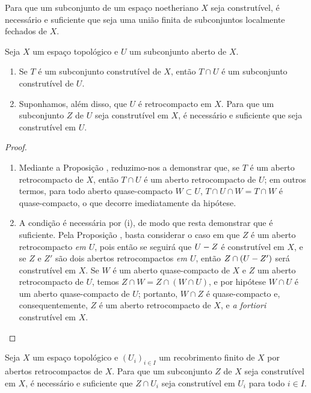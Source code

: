 \begin{corollary}[9.1.7]
\label{0.9.1.7}
Para que um subconjunto de um espaço noetheriano $X$ seja construtível, é necessário e suficiente que seja uma união finita de subconjuntos localmente fechados de $X$.
\end{corollary}

\begin{proposition}[9.1.8]
\label{0.9.1.8}
Seja $X$ um espaço topológico e $U$ um subconjunto aberto de $X$.
\begin{enumerate}
  \item[{\rm(i)}] Se $T$ é um subconjunto construtível de $X$, então $T\cap U$ é um subconjunto construtível de $U$.
  \item[{\rm(ii)}] Suponhamos, além disso, que $U$ é retrocompacto em $X$. Para que um subconjunto $Z$ de $U$ seja construtível em $X$, é necessário e suficiente que seja construtível em $U$.
\end{enumerate}
\end{proposition}

\begin{proof}
\medskip\noindent
\begin{enumerate}
  \item[(i)] Mediante a Proposição , reduzimo-nos a demonstrar que, se $T$ é um aberto retrocompacto de $X$, então $T\cap U$ é um aberto retrocompacto de $U$; em outros termos, para todo aberto quase-compacto $W\subset U$, $T\cap U\cap W=T\cap W$ é quase-compacto, o que decorre imediatamente da hipótese.
  \item[(ii)] A condição é necessária por (i), de modo que resta demonstrar que é suficiente.
    Pela Proposição , basta considerar o caso em que $Z$ é um aberto retrocompacto \emph{em $U$}, pois então se seguirá que $U- Z$ é construtível em $X$, e se $Z$ e $Z'$ são dois abertos retrocompactos \emph{em $U$}, então $Z\cap(U- Z')$ será construtível em $X$.
    Se $W$ é um aberto quase-compacto de $X$ e $Z$ um aberto retrocompacto de $U$, temos $Z\cap W=Z\cap(W\cap U)$, e por hipótese $W\cap U$ é um aberto quase-compacto de $U$; portanto, $W\cap Z$ é quase-compacto e, consequentemente, $Z$ é um aberto retrocompacto de $X$, e \emph{a fortiori} construtível em $X$.
\end{enumerate}
\end{proof}

\begin{corollary}[9.1.9]
\label{0.9.1.9}
Seja $X$ um espaço topológico e $(U_i)_{i\in I}$ um recobrimento finito de $X$ por abertos retrocompactos de $X$.
Para que um subconjunto $Z$ de $X$ seja construtível em $X$, é necessário e suficiente que $Z\cap U_i$ seja construtível em $U_i$ para todo $i\in I$.
\end{corollary}

